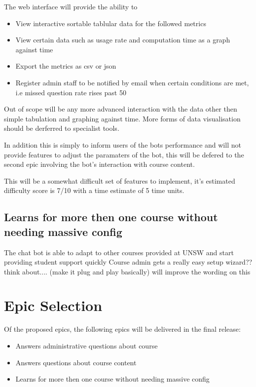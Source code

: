 \documentclass{article}
\begin{document}
The web interface will provide the ability to 
\begin{itemize}
  \item View interactive sortable tablular data for the followed metrics
  \item View certain data such as usage rate and computation time as a graph against time
  \item Export the metrics as csv or json
  \item Register admin staff to be notified by email when certain conditions are met, i.e missed question rate rises past 50%
\end{itemize}

Out of scope will be any more advanced interaction with the data other then simple tabulation and graphing against time. More forms of data visualisation should be derferred to specialist tools. 

In addition this is simply to inform users of the bots performance and will not provide features to adjust the paramaters of the bot, this will be defered to the second epic involving the bot's interaction with course content. 

This will be a somewhat difficult set of features to implement, it's estimated difficulty score is 7/10 with a time estimate of 5 time units.

\subsection{Learns for more then one course without needing massive config} %
The chat bot is able to adapt to other courses provided at UNSW and start providing student support quickly 
Course admin gets a really easy setup wizard?? think about.... 
(make it plug and play basically)   will improve the wording on this


\section{Epic Selection}
Of the proposed epics, the following epics will be delivered in the final release:
\begin{itemize}
  \item Answers administrative questions about course
  \item Answers questions about course content
  \item Learns for more then one course without needing massive config
\end{itemize}
\end{document}
